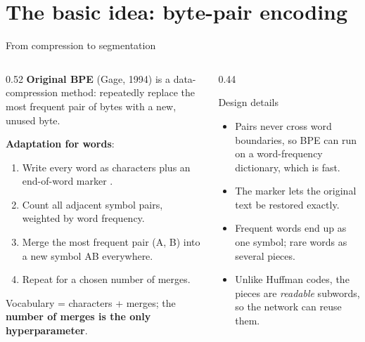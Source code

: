 \documentclass[aspectratio=169,11pt]{beamer}
\begin{document}
\section{The basic idea: byte-pair encoding}

\begin{frame}{From compression to segmentation}
  \begin{columns}[T]
    \begin{column}{0.52\textwidth}
      \small
      \textbf{Original BPE} (Gage, 1994) is a data-compression method: repeatedly replace the most frequent pair of bytes with a new, unused byte.
      \vspace{1mm}

      \textbf{Adaptation for words}:
      \begin{enumerate}
        \item Write every word as characters plus an end-of-word marker .
        \item Count all adjacent symbol pairs, weighted by word frequency.
        \item Merge the most frequent pair (A, B) into a new symbol AB everywhere.
        \item Repeat for a chosen number of merges.
      \end{enumerate}
      Vocabulary = characters + merges; the \textbf{number of merges is the only hyperparameter}.
    \end{column}
    \begin{column}{0.44\textwidth}
      \begin{block}{Design details}
        \small
        \begin{itemize}
          \item Pairs never cross word boundaries, so BPE can run on a word-frequency dictionary, which is fast.
          \item The  marker lets the original text be restored exactly.
          \item Frequent words end up as one symbol; rare words as several pieces.
          \item Unlike Huffman codes, the pieces are \emph{readable} subwords, so the network can reuse them.
        \end{itemize}
      \end{block}
    \end{column}
  \end{columns}
\end{frame}
\end{document}
